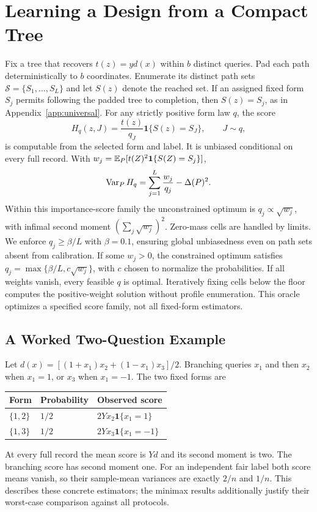 \section{Learning a Design from a Compact Tree}\label{app:pathdesign}
Fix a tree that recovers $t(z)=yd(x)$ within $b$ distinct queries. Pad each path deterministically to $b$ coordinates. Enumerate its distinct path sets $\mathcal S=\{S_1,\ldots,S_L\}$ and let $S(z)$ denote the reached set. If an assigned fixed form $S_j$ permits following the padded tree to completion, then $S(z)=S_j$, as in Appendix~\ref{app:universal}. For any strictly positive form law $q$, the score
\[
 H_q(z,J)=\frac{t(z)}{q_J}\mathbf1\{S(z)=S_J\},\qquad J\sim q,
\]
is computable from the selected form and label. It is unbiased conditional on every full record. With $w_j=\mathbb{E}_P[t(Z)^2\mathbf1\{S(Z)=S_j\}]$,
\begin{equation}
 \operatorname{Var}_P H_q=\sum_{j=1}^L\frac{w_j}{q_j}-\Delta(P)^2.
 \label{eq:pathvariance}
\end{equation}
Within this importance-score family the unconstrained optimum is $q_j\propto\sqrt{w_j}$, with infimal second moment $(\sum_j\sqrt{w_j})^2$. Zero-mass cells are handled by limits. We enforce $q_j\ge\beta/L$ with $\beta=0.1$, ensuring global unbiasedness even on path sets absent from calibration. If some $w_j>0$, the constrained optimum satisfies $q_j=\max\{\beta/L,c\sqrt{w_j}\}$, with $c$ chosen to normalize the probabilities. If all weights vanish, every feasible $q$ is optimal. Iteratively fixing cells below the floor computes the positive-weight solution without profile enumeration. This oracle optimizes a specified score family, not all fixed-form estimators.

\subsection{A Worked Two-Question Example}
Let $d(x)=[(1+x_1)x_2+(1-x_1)x_3]/2$. Branching queries $x_1$ and then $x_2$ when $x_1=1$, or $x_3$ when $x_1=-1$. The two fixed forms are
\begin{center}
\begin{tabular}{lll}
\toprule
Form & Probability & Observed score\\
\midrule
$\{1,2\}$ & $1/2$ & $2Yx_2\mathbf1\{x_1=1\}$\\
$\{1,3\}$ & $1/2$ & $2Yx_3\mathbf1\{x_1=-1\}$\\
\bottomrule
\end{tabular}
\end{center}
At every full record the mean score is $Yd$ and its second moment is two. The branching score has second moment one. For an independent fair label both score means vanish, so their sample-mean variances are exactly $2/n$ and $1/n$. This describes these concrete estimators; the minimax results additionally justify their worst-case comparison against all protocols.

